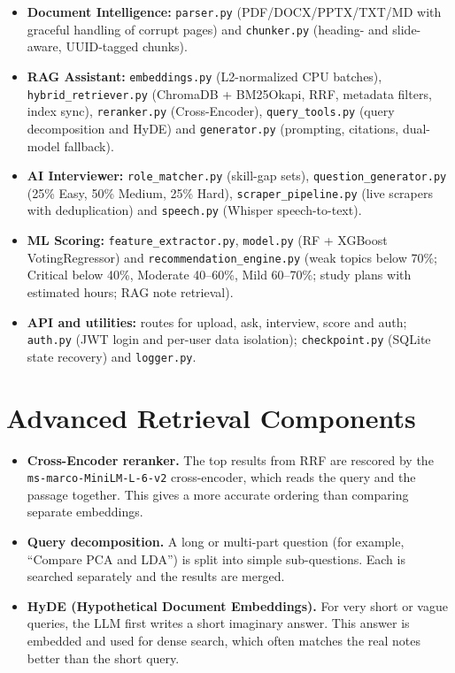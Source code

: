 \documentclass[11pt,a4paper]{report}
\begin{document}
\begin{itemize}
  \item \textbf{Document Intelligence:} \texttt{parser.py} (PDF/DOCX/PPTX/TXT/MD with graceful handling of corrupt pages) and \texttt{chunker.py} (heading- and slide-aware, UUID-tagged chunks).
  \item \textbf{RAG Assistant:} \texttt{embeddings.py} (L2-normalized CPU batches), \texttt{hybrid\_retriever.py} (ChromaDB + BM25Okapi, RRF, metadata filters, index sync), \texttt{reranker.py} (Cross-Encoder), \texttt{query\_tools.py} (query decomposition and HyDE) and \texttt{generator.py} (prompting, citations, dual-model fallback).
  \item \textbf{AI Interviewer:} \texttt{role\_matcher.py} (skill-gap sets), \texttt{question\_generator.py} (25\% Easy, 50\% Medium, 25\% Hard), \texttt{scraper\_pipeline.py} (live scrapers with deduplication) and \texttt{speech.py} (Whisper speech-to-text).
  \item \textbf{ML Scoring:} \texttt{feature\_extractor.py}, \texttt{model.py} (RF + XGBoost VotingRegressor) and \texttt{recommendation\_engine.py} (weak topics below 70\%; Critical below 40\%, Moderate 40--60\%, Mild 60--70\%; study plans with estimated hours; RAG note retrieval).
  \item \textbf{API and utilities:} routes for upload, ask, interview, score and auth; \texttt{auth.py} (JWT login and per-user data isolation); \texttt{checkpoint.py} (SQLite state recovery) and \texttt{logger.py}.
\end{itemize}

\section{Advanced Retrieval Components}

\begin{itemize}
  \item \textbf{Cross-Encoder reranker.} The top results from RRF are rescored by the \texttt{ms-marco-MiniLM-L-6-v2} cross-encoder, which reads the query and the passage together. This gives a more accurate ordering than comparing separate embeddings.
  \item \textbf{Query decomposition.} A long or multi-part question (for example, ``Compare PCA and LDA'') is split into simple sub-questions. Each is searched separately and the results are merged.
  \item \textbf{HyDE (Hypothetical Document Embeddings).} For very short or vague queries, the LLM first writes a short imaginary answer. This answer is embedded and used for dense search, which often matches the real notes better than the short query.
\end{itemize}
\end{document}
